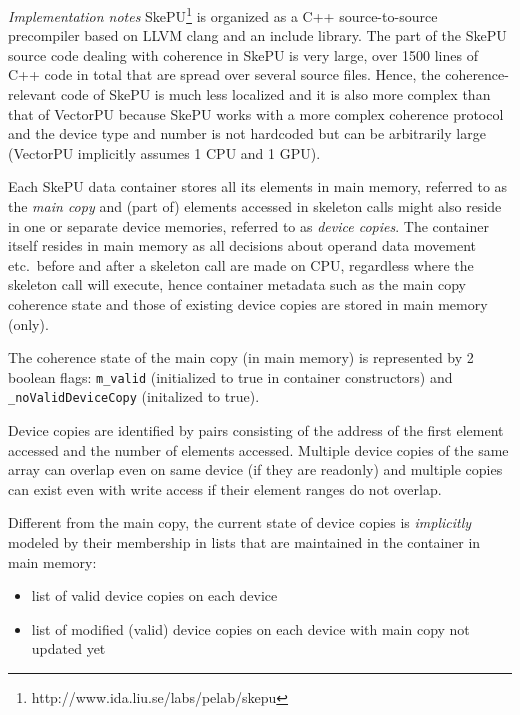 \vspace{1.4mm}
\noindent
{\em Implementation notes}
SkePU\footnote{http://www.ida.liu.se/labs/pelab/skepu} 
is organized as a C++ source-to-source precompiler based on 
LLVM clang and an include library.
The part of the SkePU source code dealing with coherence in SkePU 
is very large, over 1500 lines of C++ code in total that are 
spread over several source files. Hence, 
the coherence-relevant code of SkePU is much less
localized and it is also more complex than that of VectorPU
because SkePU works with a more complex coherence protocol
and the device type and number is not hardcoded but can be 
arbitrarily large (VectorPU implicitly assumes 1 CPU and 1 GPU).
%

Each SkePU data container stores all its elements in main memory,
referred to as the \emph{main copy} and
(part of) elements accessed in skeleton calls might also reside
in one or separate device memories, referred to as \emph{device copies}.
The container itself resides in main memory as all decisions
about operand data movement etc.\ before and after a skeleton call 
are made on CPU, regardless where the skeleton call will execute, 
hence container metadata such as the main copy coherence state 
and those of existing device copies are stored in main memory (only).

The coherence state of the main copy (in main memory) 
is represented by 2 boolean flags: 
\verb+m_valid+ (initialized to true in container constructors) and 
\verb+_noValidDeviceCopy+ (initalized to true).

Device copies are identified by pairs consisting of the
address of the first element accessed and the number of
elements accessed. 
Multiple device copies of the same array can overlap 
even on same device (if they are readonly)
and multiple copies can exist even with write access if their element ranges do not overlap.

Different from the main copy, the current state of device copies 
is \emph{implicitly} modeled by their membership in lists
that are maintained in the container in main memory:
\begin{itemize}
\item list of valid device copies on each device
\item list of modified (valid) device copies on each device with main copy not updated yet
\end{itemize}

